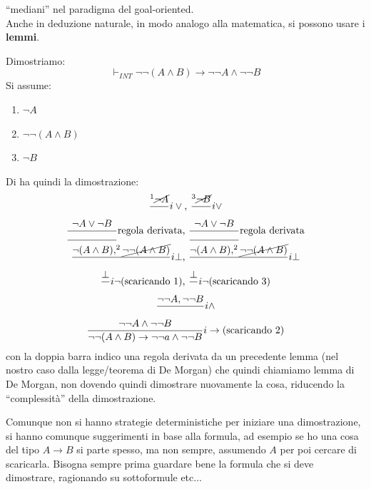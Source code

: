 \documentclass[a4paper,12pt, oneside]{book}
\begin{document}
``mediani'' nel paradigma del goal-oriented. \\
Anche in deduzione naturale, in modo analogo alla matematica, si possono usare i
\textbf{lemmi}.
\begin{esempio}
  Dimostriamo:
  \[\vdash_{INT}\neg\neg (A\land B)\to \neg\neg A\land \neg \neg B\]
  Si assume:
  \begin{enumerate}
    \item $\neg A$
    \item $\neg\neg(A\land B)$
    \item $\neg B$
  \end{enumerate}
  Di ha quindi la dimostrazione:
  \begin{gather*}
    \frac{^1 \cancel{\neg A}}{}i\lor \mbox{, }
    \frac{^3 \cancel{\neg B}}{}i\lor\\
    \frac{\neg A\lor \neg B}{\rule{49pt}{0.4pt}}\mbox{regola derivata, }
    \frac{\neg A\lor \neg B}{\rule{49pt}{0.4pt}}\mbox{regola derivata}\\
    \frac{\neg (A\land B),^2\cancel{\neg\neg(A\land B)}}{}i\bot\mbox{, }
    \frac{\neg  (A\land B),^2\cancel{\neg\neg(A\land B)}}{}i\bot\\ 
    \frac{\bot}{}i\neg\mbox{(scaricando 1), }
    \frac{\bot}{}i\neg\mbox{(scaricando 3)}\\ 
    \frac{\neg\neg A, \neg\neg B}{}i\land\\
    \frac{\neg\neg A\land \neg\neg B}{\neg\neg (A\land B)\to \neg\neg a\land
      \neg \neg B}i\to \mbox{(scaricando 2)}
  \end{gather*}
  con la doppia barra indico una regola derivata da un precedente lemma (nel
  nostro caso dalla legge/teorema di De Morgan) che quindi chiamiamo lemma di De
  Morgan, non dovendo quindi dimostrare nuovamente la cosa, riducendo la
  ``complessità'' della dimostrazione.
\end{esempio}
Comunque non si hanno strategie deterministiche per iniziare una dimostrazione,
si hanno comunque suggerimenti in base alla formula, ad esempio se ho una cosa
del tipo $A\to B$ si parte spesso, ma non sempre, assumendo $A$ per poi cercare
di scaricarla. Bisogna sempre prima guardare bene la formula che si deve
dimostrare, ragionando su sottoformule etc$\ldots$
\end{document}
